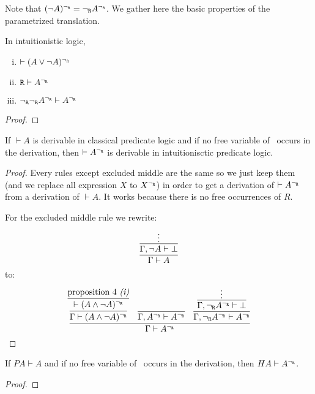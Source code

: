 Note that $(\neg A)^{\neg_{\texttt{R}}} = {\neg_{\texttt{R}}} A^{\neg_{\texttt{R}}}$. We gather here the basic properties of the parametrized translation.

\begin{proposition}
    In intuitionistic logic,
    \begin{enumerate}[(i)]
        \item $\vdash (A\vee \neg A)^{\neg_{\texttt{R}}}$
        \item $\texttt{R} \vdash A^{\neg_{\texttt{R}}}$
        \item ${\neg_{\texttt{R}}}{\neg_{\texttt{R}}} A^{\neg_{\texttt{R}}} \vdash A^{\neg_{\texttt{R}}}$
    \end{enumerate}
\end{proposition}
\begin{proof}
    
\end{proof}

\begin{theoreme}
    If $\vdash A$ is derivable in classical predicate logic and if no free variable of \R\, occurs in the derivation, then $\vdash A^{\neg_{\texttt{R}}}$ is derivable in intuitionisctic predicate logic.
\end{theoreme}
\begin{proof}
    Every rules except excluded middle are the same so we just keep them  (and we replace all expression $X$ to $X^{\neg_{\texttt{R}}}$) in order to get a derivation of $\vdash A^{\neg_{\texttt{R}}}$ from a derivation of $\vdash A$. It works because there is no free occurrences of $R$.

For the excluded middle rule we rewrite:
    $$
    \infer{
        \Gamma \vdash A
    }{
        \infer{
            \Gamma, \neg A \vdash \bottom
        }{
            \vdots
        }
    }
    $$
to:
    $$
    \infer{
        \Gamma \vdash A^\ngr 
    }{
        \infer{
            \Gamma \vdash (A \wedge \neg A)^\ngr
        }{
            \infer{
                \vdash (A \wedge \neg A)^\ngr
            }{
                \text{proposition 4 \textit{(i)}}
            }
        }
        &
        \infer{
            \Gamma, A^\ngr \vdash A^\ngr 
        }{}
        &
        \infer{
            \Gamma, \ngr A^\ngr \vdash A^\ngr 
        }{
            \infer{
                \Gamma, \ngr A^\ngr \vdash \bottom
            }{
                \vdots
            }
        }
    }
    $$
\end{proof}

\begin{theoreme}
    If $PA \vdash A$ and if no free variable of \R\, occurs in the derivation, then $HA \vdash A^{\neg_{\texttt{R}}}$.
\end{theoreme}
\begin{proof}
    
\end{proof}

